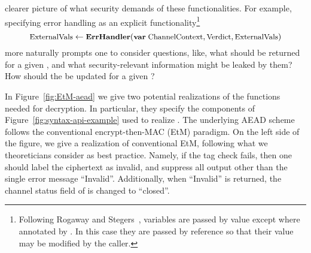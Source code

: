 clearer picture of what security demands of these functionalities. For example,
specifying error handling as an explicit functionality\footnote{Following
Rogaway and Stegers~\cite{RS09}, variables are passed by value except where
annotated by . In this case they are passed by reference so that
their value may be modified by the caller.}
\[
\textrm{\small ExternalVals} \gets
                                  \textrm{\small\bf ErrHandler}(\textrm{\small\bf var}\;
                                  \textrm{\small ChannelContext},
                                  \textrm{\small Verdict}, \textrm{\small ExternalVals})
\]
more naturally prompts one to consider questions, like, what  should
be returned for a given , and what
security-relevant information might be leaked by them?  How should the
 be updated for a given ?


In Figure~\ref{fig:EtM-aead} we give two potential realizations of the
functions needed for decryption. In particular, they specify the components of
Figure~\ref{fig:syntax-api-example} used to realize . The
underlying AEAD scheme follows the conventional encrypt-then-MAC (EtM)
paradigm.
%
On the left side of the figure, we give a realization of conventional
EtM, following what we theoreticians consider as best practice.  Namely, if the tag check fails, then
one should label the ciphertext as invalid, and suppress all output other than
the single error message ``Invalid''.
Additionally, when ``Invalid'' is returned, the channel status field
of  is changed to ``closed''.
%

